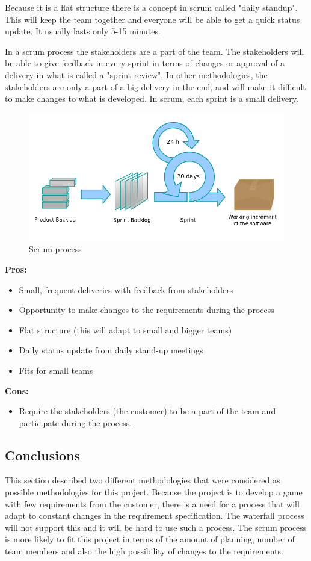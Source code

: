 Because it is a flat structure there is a concept in scrum called "daily standup". This will keep the team together and everyone will be able to get a quick status update. It usually lasts only 5-15 minutes. 

In a scrum process the stakeholders are a part of the team. The stakeholders will be able to give
feedback in every sprint in terms of changes or approval of a delivery in what is called a "sprint review".
In other methodologies, the stakeholders are only a part of a big delivery in the end, and will 
make it difficult to make changes to what is developed. In scrum, each sprint is a small delivery.

\begin{figure}[!ht]
    \includegraphics[scale=0.4]{pictures/Scrumprocess.png}
    \caption{Scrum process}
\end{figure}

{\bf Pros: }
\begin{itemize}
	\item Small, frequent deliveries with feedback from stakeholders
	\item Opportunity to make changes to the requirements during the process
	\item Flat structure (this will adapt to small and bigger teams)
	\item Daily status update from daily stand-up meetings
	\item Fits for small teams
\end{itemize}

{\bf Cons: }
\begin{itemize}
	\item Require the stakeholders (the customer) to be a part of the team and participate during the process.
\end{itemize}

\subsection{Conclusions}
This section described two different methodologies that were considered as possible methodologies for this project. Because the project is to develop a game with few requirements from the customer, there is a need for a process that will adapt to constant changes in the requirement specification. The waterfall process will not support this and it will be hard to use such a process. The scrum process is more likely to fit this project in terms of the amount of planning, 
number of team members and also the high possibility of changes to the requirements.



